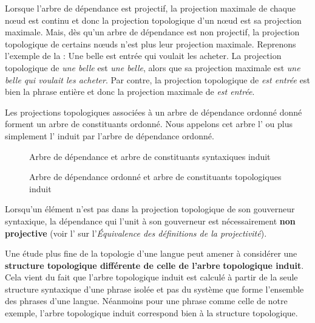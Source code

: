 Lorsque l’arbre de dépendance est projectif, la projection maximale de chaque nœud est continu et donc la projection topologique d’un nœud est sa projection maximale. Mais, dès qu’un arbre de dépendance est non projectif, la projection topologique de certains nœuds n’est plus leur projection maximale. Reprenons l’exemple de la  :
\ea
    {Une belle est entrée qui voulait les acheter}.
\z
La projection topologique de \textit{une belle} est \textit{une belle}, alors que sa projection maximale est \textit{une belle qui voulait les acheter}. Par contre, la projection topologique de \textit{est entrée} est bien la phrase entière et donc la projection maximale de \textit{est entrée}.

Les projections topologiques associées à un arbre de dépendance ordonné donné forment un arbre de constituants ordonné. Nous appelons cet arbre l’ ou plus simplement l’ induit par l’arbre de dépendance ordonné.

\begin{figure}

\caption{\label{fig:}}Arbre de dépendance et arbre de constituants syntaxiques induit

\end{figure}

\begin{figure}\bfseries

\caption{\label{fig:}Arbre de dépendance ordonné et arbre de constituants topologiques induit}

\end{figure}

Lorsqu’un élément n’est pas dans la projection topologique de son gouverneur syntaxique, la dépendance qui l’unit à son gouverneur est nécessairement \textbf{non projective} (voir l’ sur l’\textit{Équivalence des définitions de la projectivité}).

Une étude plus fine de la topologie d’une langue peut amener à considérer une \textbf{structure topologique différente de celle de l’arbre} \textbf{topologique induit}. Cela vient du fait que l’arbre topologique induit est calculé à partir de la seule structure syntaxique d’une phrase isolée et pas du système que forme l’ensemble des phrases d’une langue. Néanmoins pour une phrase comme celle de notre exemple, l’arbre topologique induit correspond bien à la structure topologique.

